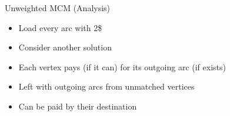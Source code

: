 \begin{frame}{Unweighted MCM (Analysis)}
\begin{itemize}
  \item<1> Load every arc with 2\$
  \item<3> Consider another solution
  \item<4> Each vertex pays (if it can) for its outgoing arc (if exists)
  \item<6> Left with outgoing arcs from unmatched vertices 
  \item<7> Can be paid by their destination 
\end{itemize}
\centering

\end{frame}
